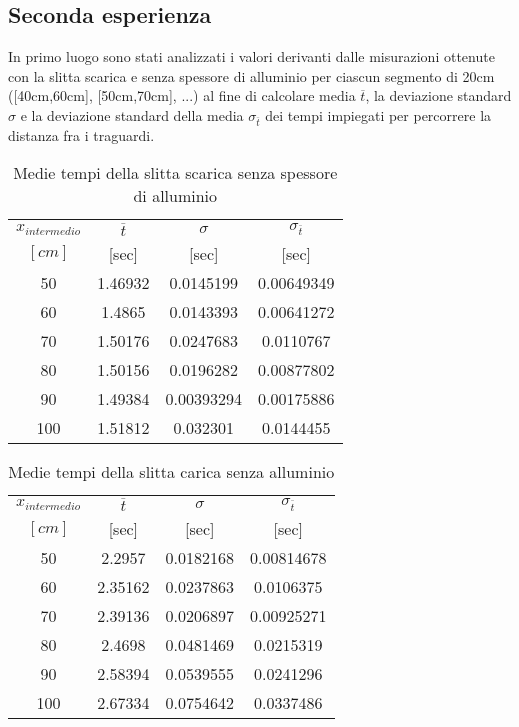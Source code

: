 \documentclass[a4paper,11pt,oneside]{article}
\begin{document}
\subsection{Seconda esperienza}
In primo luogo sono stati analizzati i valori derivanti dalle misurazioni ottenute con la slitta scarica e senza spessore di alluminio per ciascun segmento di 20cm ([40cm,60cm], [50cm,70cm], ...) al fine di calcolare media $\overline{t}$, la deviazione standard $\sigma$ e la deviazione standard della media $\sigma_{\overline{t}}$ dei tempi impiegati per percorrere la distanza fra i traguardi.\\
\begin{table}[h!]
\centering
\begin{tabular}{c|ccc}
\toprule
$x_{intermedio}$&$\overline{t}$&$\sigma$&$\sigma_{\overline{t}}$\\
$[\si{cm}]$&[sec]&[sec]&[sec]\\
\midrule
50	&1.46932	&0.0145199	&0.00649349\\
60	&1.4865	    &0.0143393	&0.00641272\\
70	&1.50176	&0.0247683	&0.0110767\\
80	&1.50156	&0.0196282	&0.00877802\\
90	&1.49384	&0.00393294	&0.00175886\\
100	&1.51812	&0.032301	&0.0144455\\
\bottomrule
\end{tabular}
    \caption{Medie tempi della slitta scarica senza spessore di alluminio}
    \label{tab:nm_na}
\end{table}

\begin{table}[h!]
\centering
\begin{tabular}{c|ccc}
\toprule
$x_{intermedio}$&$\overline{t}$&$\sigma$&$\sigma_{\overline{t}}$\\
$[\si{cm}]$&[sec]&[sec]&[sec]\\
\midrule
50	&2.2957	&0.0182168	&0.00814678\\
60	&2.35162	&0.0237863	&0.0106375\\
70	&2.39136	&0.0206897	&0.00925271\\
80	&2.4698	&0.0481469	&0.0215319\\
90  &2.58394	&0.0539555	&0.0241296\\
100	&2.67334	&0.0754642	&0.0337486\\
\bottomrule
\end{tabular}
    \caption{Medie tempi della slitta carica senza alluminio}
    \label{tab:sm_na}
\end{table}
\end{document}
